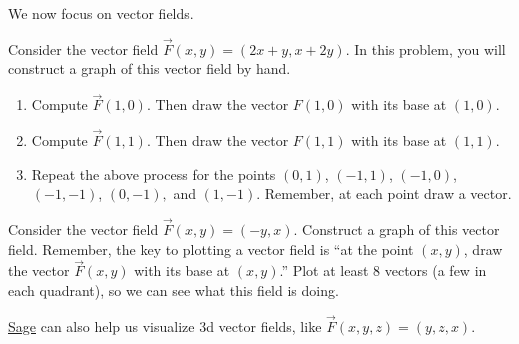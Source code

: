 We now focus on vector fields.

\begin{problem}%
%
%
 Consider the vector field $\vec F(x,y)=(2x+y,x+2y)$.  In this problem, you will construct a graph of this vector field by hand.
\begin{enumerate}
 \item Compute $\vec F(1,0)$. Then draw the vector $F(1,0)$ with its base at $(1,0)$.
 \item Compute $\vec F(1,1)$. Then draw the vector $F(1,1)$ with its base at $(1,1)$.
 \item Repeat the above process for the points $(0,1)$, $(-1,1)$, $(-1,0)$, $(-1,-1)$, $(0,-1),$ and $(1,-1)$. Remember, at each point draw a vector.  
\end{enumerate}
\end{problem}


\begin{problem}%
%
 Consider the vector field $\vec F(x,y)=(-y,x)$. Construct a graph of this vector field. Remember, the key to plotting a vector field is ``at the point $(x,y)$, draw the vector $\vec F(x,y)$ with its base at $(x,y)$.''  Plot at least 8 vectors (a few in each quadrant), so we can see what this field is doing.
\end{problem}


\href{http://aleph.sagemath.org/?z=eJxz06jQqdSp0lSwVdAA0joVmlwFOfkl8WWpySX5RfFpmak5KcYpGm46CkCFusY6xpo6IIUQlkYVhKEJAOGFExs}{Sage} can also help us visualize 3d vector fields, like $\vec F(x,y,z)=(y,z,x)$. 

